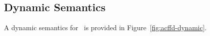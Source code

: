%
%
%
%

\subsection{Dynamic Semantics}\label{acffd-dynamic}
A dynamic semantics for \acffdcore\ is provided in
Figure~\ref{fig:acffd-dynamic}.


